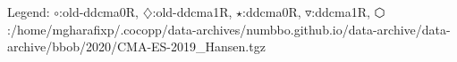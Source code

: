 Legend: {\color{NavyBlue}$\circ$}:old-ddcma0R, {\color{Magenta}$\diamondsuit$}:old-ddcma1R, {\color{Orange}$\star$}:ddcma0R, {\color{CornflowerBlue}$\triangledown$}:ddcma1R, {\color{red}$\varhexagon$}:/home/mgharafixp/.cocopp/data-archives/numbbo.github.io/data-archive/data-archive/bbob/2020/CMA-ES-2019\_Hansen.tgz